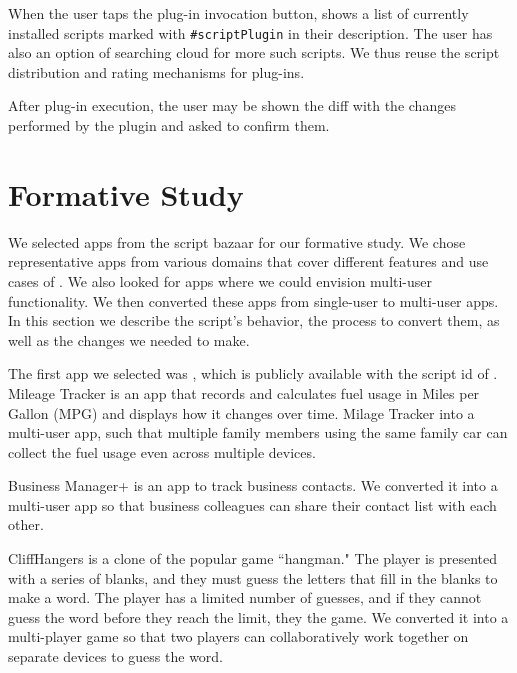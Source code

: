 \documentclass[article]{sigplanconf}
\begin{document}
When the user taps the plug-in invocation button, \TD shows a list of currently
installed scripts marked with \texttt{\#scriptPlugin} in their description.
The user has also an option of searching \TD cloud for more such scripts.
We thus reuse the script distribution and rating mechanisms for plug-ins.

After plug-in execution, the user may be shown the diff with the changes performed
by the plugin and asked to confirm them.

\section{Formative Study}
\label{sec:Formative}

We selected \numFormative apps from the \TD script bazaar for our formative study. 
We chose representative apps from various domains that cover different features and use cases of \TD.  We also looked for apps where we could envision multi-user functionality.
We then converted these apps from single-user to multi-user apps. In this section we describe the script's behavior, the process to convert them, as well as the changes we needed to make.

The first app we selected was \MT, which is publicly available with the script id of
.  Mileage Tracker is an app that records and calculates fuel usage in Miles per Gallon (MPG) and displays how it changes over time.  Milage Tracker into a multi-user app, such that multiple family members using the same family car can collect the fuel usage even across multiple devices.

Business Manager+ is an app to track business contacts.  We converted it into a multi-user app so that business colleagues can share their contact list with each other.

CliffHangers is a clone of the popular game ``hangman."  The player is presented with a series of blanks, and they must guess the letters that fill in the blanks to make a word.  The player has a limited number of guesses, and if they cannot guess the word before they reach the limit, they  the game.  We converted it into a multi-player game so that two players can collaboratively work together on separate devices to guess the word.
\end{document}
